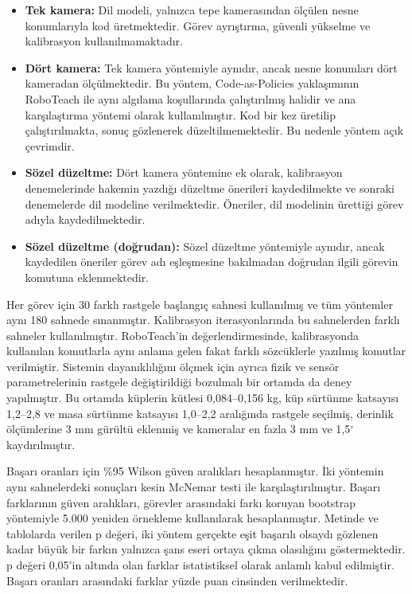 \documentclass[preprint,12pt]{elsarticle}
\begin{document}
\begin{itemize}

\item
  \textbf{Tek kamera:} Dil modeli, yalnızca tepe kamerasından ölçülen nesne konumlarıyla kod üretmektedir. Görev ayrıştırma, güvenli yükselme ve kalibrasyon kullanılmamaktadır.
\item
  \textbf{Dört kamera:} Tek kamera yöntemiyle aynıdır, ancak nesne konumları dört kameradan ölçülmektedir. Bu yöntem, Code-as-Policies \cite{liang2023cap} yaklaşımının RoboTeach ile aynı algılama koşullarında çalıştırılmış halidir ve ana karşılaştırma yöntemi olarak kullanılmıştır. Kod bir kez üretilip çalıştırılmakta, sonuç gözlenerek düzeltilmemektedir. Bu nedenle yöntem açık çevrimdir.
\item
  \textbf{Sözel düzeltme:} Dört kamera yöntemine ek olarak, kalibrasyon denemelerinde hakemin yazdığı düzeltme önerileri kaydedilmekte ve sonraki denemelerde dil modeline verilmektedir. Öneriler, dil modelinin ürettiği görev adıyla kaydedilmektedir.
\item
  \textbf{Sözel düzeltme (doğrudan):} Sözel düzeltme yöntemiyle aynıdır, ancak kaydedilen öneriler görev adı eşleşmesine bakılmadan doğrudan ilgili görevin komutuna eklenmektedir.
\end{itemize}

Her görev için 30 farklı rastgele başlangıç sahnesi kullanılmış ve tüm yöntemler aynı 180 sahnede sınanmıştır. Kalibrasyon iterasyonlarında bu sahnelerden farklı sahneler kullanılmıştır. RoboTeach'in değerlendirmesinde, kalibrasyonda kullanılan komutlarla aynı anlama gelen fakat farklı sözcüklerle yazılmış komutlar verilmiştir. Sistemin dayanıklılığını ölçmek için ayrıca fizik ve sensör parametrelerinin rastgele değiştirildiği bozulmalı bir ortamda da deney yapılmıştır. Bu ortamda küplerin kütlesi 0,084--0,156 kg, küp sürtünme katsayısı 1,2--2,8 ve masa sürtünme katsayısı 1,0--2,2 aralığında rastgele seçilmiş, derinlik ölçümlerine 3 mm gürültü eklenmiş ve kameralar en fazla 3 mm ve 1,5$^\circ$ kaydırılmıştır.

Başarı oranları için \%95 Wilson güven aralıkları hesaplanmıştır. İki yöntemin aynı sahnelerdeki sonuçları kesin McNemar testi ile karşılaştırılmıştır. Başarı farklarının güven aralıkları, görevler arasındaki farkı koruyan bootstrap yöntemiyle 5.000 yeniden örnekleme kullanılarak hesaplanmıştır. Metinde ve tablolarda verilen p değeri, iki yöntem gerçekte eşit başarılı olsaydı gözlenen kadar büyük bir farkın yalnızca şans eseri ortaya çıkma olasılığını göstermektedir. p değeri 0,05'in altında olan farklar istatistiksel olarak anlamlı kabul edilmiştir. Başarı oranları arasındaki farklar yüzde puan cinsinden verilmektedir.
\end{document}
